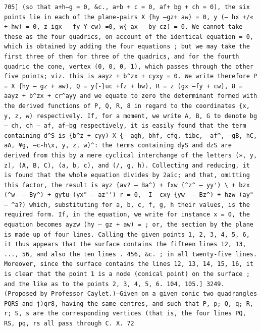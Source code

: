 \documentclass[12pt]{article}
\theoremstyle{plain}
\begin{document}
\newpage
\setcounter{page}{569}
\begin{verbatim}
705] (so that a+h—g = 0, &c., a+b + c = 0, af+ bg + ch = 0), the six points lie in each of the plane-pairs X {hy —gz+ aw) = 0, y (— hx +/« + hw) = 0, z igx — fy ¥ cw) =0, w{—ax — by—cz) = 0. We cannot take these as the four quadrics, on account of the identical equation = 0, which is obtained by adding the four equations ; but we may take the first three of them for three of the quadrics, and for the fourth quadric the cone, vertex (0, 0, 0, 1), which passes through the other five points; viz. this is aayz + b^zx + cyxy = 0. We write therefore P = X {hy — gz + aw), Q = y{-}uc +fz + bw), R = z (gx —fy + cw), 8 = aayz + b^zx + cr^ayy and we equate to zero the determinant formed with the derived functions of P, Q, R, 8 in regard to the coordinates {x, y, z, w) respectively. If, for a moment, we write A, B, G to denote bg — ch, ch — af, af—bg respectively, it is easily found that the term containing d^S is {b^z + cyy) X {— agh, bhf, cfg, tibc, —af^, —gB, hC, aA, ¥g, —c-h\x, y, z, w)^: the terms containing dyS and dzS are derived from this by a mere cyclical interchange of the letters (», y, z), (A, B, C), (a, b, c), and (/, g, h). Collecting and reducing, it is found that the whole equation divides by 2aic; and that, omitting this factor, the result is ayz {av? — Ba^) + fxw {^z^ — yy') \ + bzx (^w- — By^) + gytu (yx" — az'') r = 0, -I- cxy {yw- — Bz^) + hzw (ay" — ^a?) which, substituting for a, b, c, f, g, h their values, is the required form. If, in the equation, we write for instance x = 0, the equation becomes ayzw (hy — gz + aw) = ; or, the section by the plane is made up of four lines. Calling the given points 1, 2, 3, 4, 5, 6, it thus appears that the surface contains the fifteen lines 12, 13, ..., 56, and also the ten lines . 456, &c. ; in all twenty-five lines. Moreover, since the surface contains the lines 12, 13, 14, 15, 16, it is clear that the point 1 is a node (conical point) on the surface ; and the like as to the points 2, 3, 4, 5, 6. 104, 105.] 3249. (Proposed by Professor Caylet.)—Given on a given conic two quadrangles PQRS and j)qr8, having the same centres, and such that P, p; Q, q; R, r; S, s are the corresponding vertices (that is, the four lines PQ, RS, pq, rs all pass through C. X. 72 
\end{verbatim}
\end{document}
